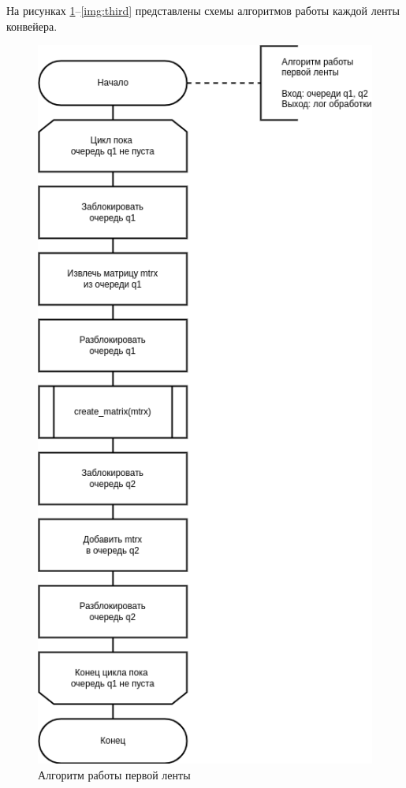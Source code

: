 На рисунках \ref{img:first}--\ref{img:third} представлены схемы алгоритмов работы каждой ленты конвейера.

\begin{figure}[H]
	\begin{center}
		\includegraphics[scale=0.63]{img/first.png}
	\end{center}
	\captionsetup{justification=centering}
	\caption{Алгоритм работы первой ленты}
	\label{img:first}
\end{figure}

